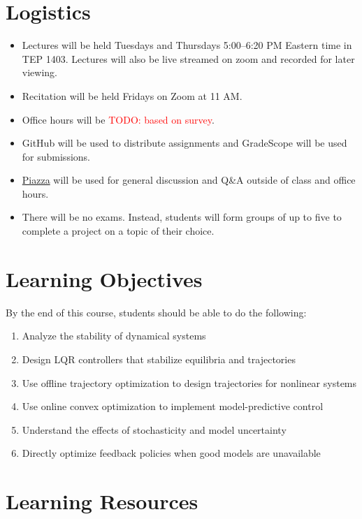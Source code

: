 \documentclass[11pt,letterpaper]{article}
\newcommand{\todo}[1]{\textcolor{red}{TODO: #1}}
\begin{document}
\section*{Logistics}

\begin{itemize}
	\item Lectures will be held Tuesdays and Thursdays 5:00--6:20 PM Eastern time in TEP 1403. Lectures will also be live streamed on zoom and recorded for later viewing.
	\item Recitation will be held Fridays on Zoom at 11 AM.
	\item Office hours will be \todo{based on survey}.
	\item GitHub will be used to distribute assignments and GradeScope will be used for submissions.
	\item \href{https://piazza.com/cmu/spring2024/16745/home}{Piazza} will be used for general discussion and Q\&A outside of class and office hours.
	\item There will be no exams. Instead, students will form groups of up to five to complete a project on a topic of their choice.
\end{itemize}

\newpage 
\section*{Learning Objectives}
By the end of this course, students should be able to do the following:
\begin{enumerate}
	\item Analyze the stability of dynamical systems
	\item Design LQR controllers that stabilize equilibria and trajectories
	\item Use offline trajectory optimization to design trajectories for nonlinear systems
	\item Use online convex optimization to implement model-predictive control
	\item Understand the effects of stochasticity and model uncertainty
	\item Directly optimize feedback policies when good models are unavailable
\end{enumerate}

\section*{Learning Resources}
\end{document}
